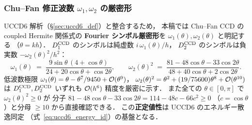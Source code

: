\subsubsection{Chu--Fan 修正波数 \texorpdfstring{$\omega_1,\omega_2$}{omega1, omega2} の厳密形}
\label{sec:ccd_omega_weights}

UCCD6 解析（§\ref{sec:uccd6_def}）と整合するため，
本稿では Chu--Fan CCD の coupled Hermite 関係式の
\textbf{Fourier シンボル厳密形}を $\omega_1(\theta),\omega_2(\theta)$ と明記する
（$\theta = kh$）．
$D_1^{\mathrm{CCD}}$ のシンボルは純虚数 $i\,\omega_1(\theta)/h$，
$D_2^{\mathrm{CCD}}$ のシンボルは負実数 $-\omega_2(\theta)^2/h^2$：
\begin{equation}
  \omega_1(\theta)
  \;=\; \frac{9\sin\theta\,(4 + \cos\theta)}{24 + 20\cos\theta + \cos 2\theta},
  \qquad
  \omega_2(\theta)^{2}
  \;=\; \frac{81 - 48\cos\theta - 33\cos 2\theta}{48 + 40\cos\theta + 2\cos 2\theta}.
  \label{eq:ccd_omega_12}
\end{equation}
低波数極限 $\omega_1(\theta) = \theta - \theta^7/9450 + \mathcal{O}(\theta^9)$，
$\omega_2(\theta)^2 = \theta^2 + (19/75600)\theta^8 + \mathcal{O}(\theta^{10})$ は
$D_1^{\mathrm{CCD}}, D_2^{\mathrm{CCD}}$ いずれも $\mathcal{O}(h^6)$ 精度を厳密に示す．
また全ての $\theta\in[0,\pi]$ で $\omega_2(\theta)^2 \ge 0$ が
分子 $81 - 48\cos\theta - 33\cos 2\theta = 114 - 48c - 66c^2 \ge 0$
（$c=\cos\theta$）と分母 $\ge 10$ から直接確認できる．
この\textbf{正定値性}は UCCD6 のエネルギー散逸同定
（式~\eqref{eq:uccd6_energy_id}）の基盤となる．
